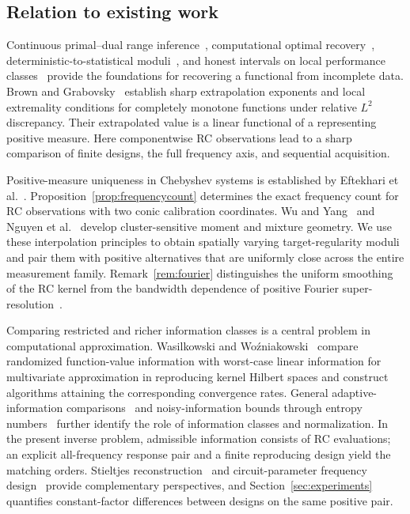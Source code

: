 \documentclass[10pt]{amsart}
\theoremstyle{definition}
\theoremstyle{remark}
\begin{document}
\subsection{Relation to existing work}
Continuous primal--dual range inference~\cite{stark}, computational optimal recovery~\cite{ettehad}, deterministic-to-statistical moduli~\cite{donoho}, and honest intervals on local performance classes~\cite{cailow} provide the foundations for recovering a functional from incomplete data. Brown and Grabovsky~\cite{browngrabovsky} establish sharp extrapolation exponents and local extremality conditions for completely monotone functions under relative $L^2$ discrepancy. Their extrapolated value is a linear functional of a representing positive measure. Here componentwise RC observations lead to a sharp comparison of finite designs, the full frequency axis, and sequential acquisition.

Positive-measure uniqueness in Chebyshev systems is established by Eftekhari et al.~\cite[Proposition~8]{eftekhari}. Proposition~\ref{prop:frequencycount} determines the exact frequency count for RC observations with two conic calibration coordinates. Wu and Yang~\cite[Proposition~5]{wuyang} and Nguyen et al.~\cite[Theorem~5 and Appendix~A.6]{nguyen} develop cluster-sensitive moment and mixture geometry. We use these interpolation principles to obtain spatially varying target-regularity moduli and pair them with positive alternatives that are uniformly close across the entire measurement family. Remark~\ref{rem:fourier} distinguishes the uniform smoothing of the RC kernel from the bandwidth dependence of positive Fourier super-resolution~\cite{liuammari}.

Comparing restricted and richer information classes is a central problem in computational approximation. Wasilkowski and Wo\'zniakowski~\cite{wasilwoz} compare randomized function-value information with worst-case linear information for multivariate approximation in reproducing kernel Hilbert spaces and construct algorithms attaining the corresponding convergence rates. General adaptive-information comparisons~\cite{knu} and noisy-information bounds through entropy numbers~\cite{knpu} further identify the role of information classes and normalization. In the present inverse problem, admissible information consists of RC evaluations; an explicit all-frequency response pair and a finite reproducing design yield the matching orders. Stieltjes reconstruction~\cite{grabovsky} and circuit-parameter frequency design~\cite{sovljanski} provide complementary perspectives, and Section~\ref{sec:experiments} quantifies constant-factor differences between designs on the same positive pair.
\end{document}
